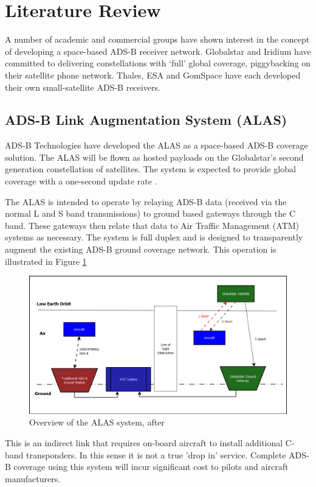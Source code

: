 \section{Literature Review}
A number of academic and commercial groups have shown interest in the concept of developing a space-based ADS-B receiver network. Globalstar and Iridium have committed to delivering constellations with `full' global coverage, piggybacking on their satellite phone network. Thales, ESA and GomSpace have each developed their own small-satellite ADS-B receivers.

\subsection{ADS-B Link Augmentation System (ALAS)}
ADS-B Technologies have developed the ALAS as a space-based ADS-B coverage solution. The ALAS will be flown as hosted payloads on the Globalstar's second generation constellation of satellites. The system is expected to provide global coverage with a one-second update rate \cite{ADS-B:Globalstar_webinar}.

The ALAS is intended to operate by relaying ADS-B data (received via the normal L and S band transmissions) to ground based gateways through the C band. These gateways then relate that data to Air Traffic Management (ATM) systems as necessary. The system is full duplex and is designed to transparently augment the existing ADS-B ground coverage network. This operation is illustrated in Figure \ref{fig:alas_overview}
\begin{figure}[htbp]
	\centering
	\includegraphics[scale = 0.40]{Pictures/alas_overview_tn.png}
	
	\caption[Overview of the ALAS system]{Overview of the ALAS system, after \cite{ADS-B:Globalstar_webinar}}
	\label{fig:alas_overview}
\end{figure}
This is an indirect link that requires on-board aircraft to install additional C-band transponders. In this sense it is not a true 'drop in' service. Complete ADS-B coverage using this system will incur significant cost to pilots and aircraft manufacturers.


